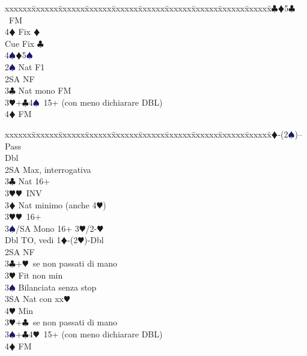 \documentclass[a4paper,italian]{article}
\newcommand{\BC}{\textcolor{OliveGreen}{$\clubsuit$}}
\newcommand{\BD}{\textcolor{RedOrange}{$\vardiamondsuit$}}
\newcommand{\BH}{\textcolor{Red2}{$\varheartsuit${}}}
\newcommand{\BS}{\textcolor{MidnightBlue}{$\spadesuit${}}}
\newenvironment{bidtable}
{\begin{tabbing}

    xxxxxx\=xxxxxx\=xxxxxx\=xxxxxx\=xxxxxx\=xxxxxx\=xxxxxx\=xxxxxx\=xxxxxx\=xxxxxx\=\kill}
{\end{tabbing} }%
\begin{document}
\begin{multicols}{2}
\begin{bidtable}
                                            4\BC{}\BD5\BC\ FM\+\\
                                            4\BD\> Fix \BD\\
                                            Cue\> Fix \BC\-\\
                                            4\BS{}\BD5\BS\-\\
                                            2\BS \> Nat F1\\
                                            2SA \> NF\\
                                            3\BC \> Nat mono FM\\
                                            3\BH {}+\BC 4\BS\ 15+ (con meno dichiarare DBL)\\
                                            4\BD \> FM\-
                                        \end{bidtable}
                                        \begin{bidtable}
                                            1\BD-(2\BS)--\+\\
                                            Pass\+\\
                                            Dbl\+\\
                                            2SA\> Max, interrogativa\+\\
                                            3\BC\> Nat 16+\+\\
                                            3\BH{}\BH\ INV\-\\
                                            3\BD\> Nat minimo (anche 4\BH)\\
                                            3\BH{}\BH\ 16+\\
                                            3\BS/SA\> Mono 16+ 3\BH/2-\BH\-\-\-\\
                                            Dbl \> TO, vedi 1\BD-(2\BH)-Dbl\\
                                            2SA \> NF\\
                                            3\BC {}+\BH\ se non passati di mano\+\\
                                            3\BH \> Fit non min\\
                                            3\BS \> Bilanciata senza stop\\
                                            3SA \> Nat con xx\BH \\
                                            4\BH \> Min\-\\
                                            3\BH {}+\BC\ se non passati di mano\\
                                            3\BS {}+\BC 4\BH\ 15+ (con meno dichiarare DBL)\\
                                            4\BD \> FM\-
                                        \end{bidtable}


\end{multicols}
\end{document}
